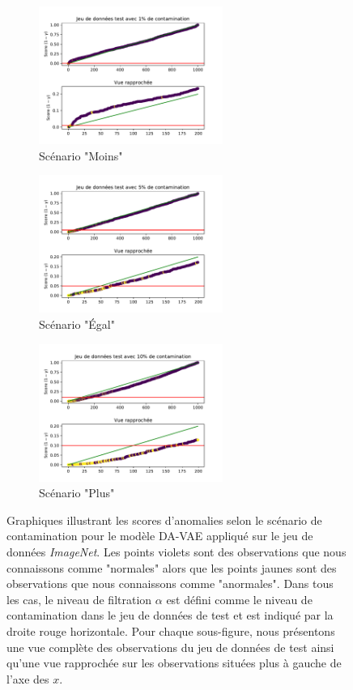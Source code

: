 \begin{figure}[htb]
	\centering
	\begin{subfigure}{6cm}
		\includegraphics[width=6cm]{images/images_davae/pvalues_scenario_cars_moins}
		\caption{Scénario "Moins"}
	\end{subfigure}
	\begin{subfigure}{6cm}
		\includegraphics[width=6cm]{images/images_davae/pvalues_scenario_cars_egal}
		\caption{Scénario "Égal"}
	\end{subfigure}
	\begin{subfigure}{6cm}
		\includegraphics[width=6cm]{images/images_davae/pvalues_scenario_cars_plus}
		\caption{Scénario "Plus"}
	\end{subfigure}

	\caption[Graphiques illustrant les scores d'anomalies selon le scénario de contamination pour le modèle DA-VAE appliqué sur le jeu de données \textit{ImageNet}.]{Graphiques illustrant les scores d'anomalies selon le scénario de contamination pour le modèle DA-VAE appliqué sur le jeu de données \textit{ImageNet}. Les points violets sont des observations que nous connaissons comme "normales" alors que les points jaunes sont des observations que nous connaissons comme "anormales". Dans tous les cas, le niveau de filtration $\alpha$ est défini comme le niveau de contamination dans le jeu de données de test et est indiqué par la droite rouge horizontale. Pour chaque sous-figure, nous présentons une vue complète des observations du jeu de données de test ainsi qu'une vue rapprochée sur les observations situées plus à gauche de l'axe des $x$.} 
	\label{fig:pvalues_scenarios}
\end{figure}

